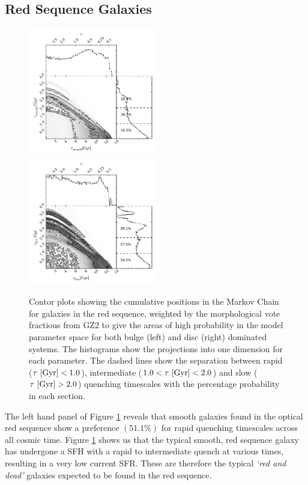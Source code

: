 \documentclass[useAMS,usenatbib]{mn2e}
\def\changed    {\color{titlecol} }
\begin{document}
\subsection{Red Sequence Galaxies}\label{rs}
\begin{figure}
\includegraphics[width=0.4975\textwidth]{red_smooth.pdf}
\includegraphics[width=0.4975\textwidth]{red_disc.pdf}
\caption[8pt]{{\changed Contor plots showing the cumulative positions in the Markov Chain for galaxies in the red sequence, weighted by the morphological vote fractious from GZ2 to give the areas of high probability in the model parameter space for both bulge (left) and disc (right) dominated systems. The histograms show the projections into one dimension for each parameter. The dashed lines show the separation between rapid ($\tau ~\rm{[Gyr]} < 1.0$), intermediate ($1.0 < \tau ~\rm{[Gyr]} < 2.0$) and slow ($\tau ~\rm{[Gyr]} > 2.0$) quenching timescales with the percentage probability in each section.}}
\label{red_s}
\end{figure}

The left hand panel of Figure \ref{red_s} reveals that smooth galaxies found in the optical red sequence {\changed show a preference $(51.1\%)$} for rapid quenching timescales across all cosmic time. Figure \ref{red_s} shows us that the typical smooth, red sequence galaxy has undergone a SFH with a rapid to intermediate quench at various times, resulting in a very low current SFR. These are therefore the typical \emph{`red and dead'} galaxies expected to be found in the red sequence. 
\end{document}
